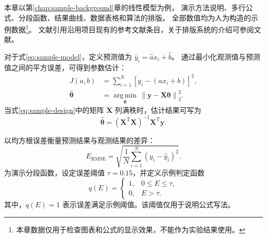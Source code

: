 \label{chap:sample-results}


本章以第\ref{chap:sample-background}章的线性模型为例，
演示方法说明、多行公式、分段函数、结果曲线、数据表格和算法的排版。
全部数值均为人为构造的示例数据\footnote{本章数据仅用于检查图表和公式的显示效果，不能作为实验结果使用。}。
文献引用沿用项目现有的参考文献条目，关于排版系统的介绍可参阅文献\cite{samplebook}。


对于式\eqref{eq:sample-model}，定义预测值为 $\hat{y}_i = \hat{a}x_i + \hat{b}$。
通过最小化观测值与预测值之间的平方误差，可得到参数估计：
\begin{align}
    J(a,b) &= \sum_{i=1}^{N}\left[y_i-(ax_i+b)\right]^2,
    \label{eq:sample-objective} \\
    \hat{\boldsymbol{\theta}} &=
    \underset{\boldsymbol{\theta}}{\operatorname{arg\,min}}\,
    \left\|\mathbf{y}-\mathbf{X}\boldsymbol{\theta}\right\|_2^2.
    \label{eq:sample-estimate}
\end{align}
当式\eqref{eq:sample-design}中的矩阵 $\mathbf{X}$ 列满秩时，估计结果可写为
\begin{equation}
    \hat{\boldsymbol{\theta}} =
    \left(\mathbf{X}^{\mathrm{T}}\mathbf{X}\right)^{-1}
    \mathbf{X}^{\mathrm{T}}\mathbf{y}.
    \label{eq:sample-solution}
\end{equation}


以均方根误差衡量预测结果与观测结果的差异：
\begin{equation}
    E_{\mathrm{RMSE}} =
    \sqrt{\frac{1}{N}\sum_{i=1}^{N}\left(y_i-\hat{y}_i\right)^2}.
    \label{eq:sample-rmse}
\end{equation}
为演示分段函数，设定误差阈值 $\tau = 0.15$，并定义示例判定函数
\begin{equation}
    q(E) =
    \begin{cases}
        1, & 0 \leq E \leq \tau, \\
        0, & E > \tau.
    \end{cases}
    \label{eq:sample-criterion}
\end{equation}
其中，$q(E)=1$ 表示误差满足示例阈值。该阈值仅用于说明公式写法。

